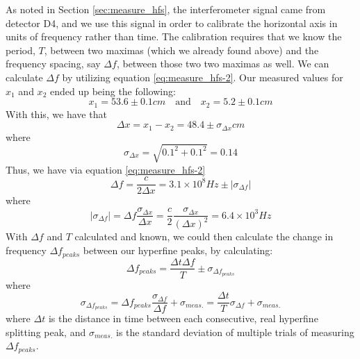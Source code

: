 \documentclass[twocolumn,amsmath,amssymb,pra, floatfix]{revtex4-2}
\begin{document}
As noted in Section \ref{sec:measure_hfs}, the interferometer signal came from detector D4, and we use this signal in order to calibrate the horizontal axis in units of frequency rather than time. The calibration requires that we know the period, $T$, between two maximas (which we already found above) and the frequency spacing, say $\Delta f$, between those two two maximas as well. We can calculate $\Delta f$ by utilizing equation \ref{eq:measure_hfs-2}. Our measured values for $x_{1}$ and $x_{2}$ ended up being the following:
\begin{equation}
    x_{1} = 53.6 \pm 0.1 \si{cm}
    \quad \mathrm{and} \quad 
    x_{2} = 5.2 \pm 0.1 \si{cm}
    \label{eq:da-1}
\end{equation} 
With this, we have that 
\begin{equation}
    \Delta x
    =
    x_{1} - x_{2}
    =
    48.4 \pm \sigma_{\Delta x} \si{cm}
    \label{eq:da-2}
\end{equation}
where
\begin{equation}
    \sigma_{\Delta x}
    =
    \sqrt{ 0.1^{2} + 0.1^{2} }
    =
    0.14
    \label{eq:da-3}
\end{equation} 
Thus, we have via equation \ref{eq:measure_hfs-2}
\begin{equation}
    \Delta f
    =
    \frac{c}{2 \Delta x}
    =
    3.1 \times 10^{8} \si{Hz} \pm \left\lvert \sigma_{\Delta f} \right\rvert
    \label{eq:da-4}
\end{equation}
where
\begin{equation}
    \left\lvert \sigma_{\Delta f} \right\rvert
    =
    \Delta f \frac{\sigma_{\Delta x}}{\Delta x}
    =
    \frac{c}{2} \frac{\sigma_{\Delta x}}{(\Delta x)^{2}}
    =
    6.4 \times 10^{3} \si{Hz}
    \label{eq:da-5}
\end{equation}
With $\Delta f$ and $T$ calculated and known, we could then calculate the change in frequency $\Delta f_{peaks}$ between our hyperfine peaks, by calculating: 
\begin{equation}
    \Delta f_{peaks} = \frac{\Delta t \Delta f}{T} \pm \sigma_{\Delta f_{peaks}}
    \label{eq:da-6}
\end{equation}
where 
\begin{equation}
    \sigma_{\Delta f_{peaks}}
    =
    \Delta f_{peaks} \frac{\sigma_{\Delta f}}{\Delta f} + \sigma_{meas.}
    =
    \frac{\Delta t}{T} \sigma_{\Delta f} + \sigma_{meas.}
    \label{eq:da-7}
\end{equation}
where $\Delta t$ is the distance in time between each consecutive, real hyperfine splitting peak, and $\sigma_{meas.}$ is the standard deviation of multiple trials of measuring $\Delta f_{peaks}$.
\end{document}

